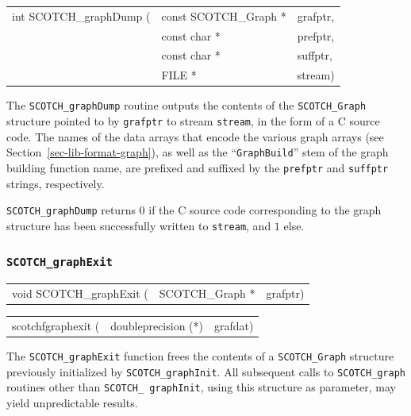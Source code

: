 \begin{itemize}
\progsyn

{\tt\begin{tabular}{l@{}ll}
int SCOTCH\_graphDump ( & const SCOTCH\_Graph * & grafptr, \\
                        & const char *          & prefptr, \\
                        & const char *          & suffptr, \\
                        & FILE *                & stream)
\end{tabular}}

\progdes

The \texttt{SCOTCH\_graphDump} routine outputs the contents of the
\texttt{SCOTCH\_\lbt Graph} structure pointed to by \texttt{grafptr}
to stream \texttt{stream}, in the form of a C source code. The names
of the data arrays that encode the various graph arrays (see
Section~\ref{sec-lib-format-graph}), as well as the
``\texttt{GraphBuild}'' stem of the graph building function name, are
prefixed and suffixed by the \texttt{prefptr} and \texttt{suffptr}
strings, respectively.

\progret

{\tt SCOTCH\_graphDump} returns $0$ if the C source code corresponding
to the graph structure has been successfully written to {\tt stream},
and $1$ else.
\end{itemize}

\subsubsection{{\tt SCOTCH\_graphExit}}

\begin{itemize}
\progsyn

{\tt\begin{tabular}{l@{}ll}
void SCOTCH\_graphExit ( & SCOTCH\_Graph * & grafptr)
\end{tabular}}

{\tt\begin{tabular}{l@{}ll}
scotchfgraphexit ( & doubleprecision (*) & grafdat)
\end{tabular}}

\progdes

The {\tt SCOTCH\_graphExit} function frees the contents of a
{\tt SCOTCH\_\lbt Graph} structure previously initialized by
{\tt SCOTCH\_\lbt graphInit}. All subsequent calls to
{\tt SCOTCH\_\lbt graph} routines other than {\tt SCOTCH\_\lbt
graphInit}, using this structure as parameter, may yield
unpredictable results.
\end{itemize}

